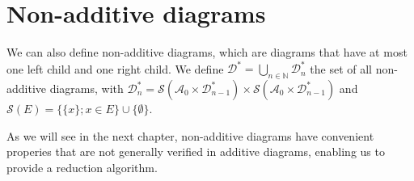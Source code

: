 \section{Non-additive diagrams}

We can also define non-additive diagrams, which are diagrams that have at most one left child and one right child. We define $\mathcal{D}^* = \bigcup_{n \in \mathbb{N}} \mathcal{D}^*_n$ the set of all non-additive diagrams, with $\mathcal{D}^*_n = \mathscr{S}(\mathcal{A}_0 \times \mathcal{D}^*_{n-1}) \times \mathscr{S}(\mathcal{A}_0 \times \mathcal{D}^*_{n-1})$ and $\mathscr{S}(E) = \{ \{x\} ; x \in E\} \cup \{\emptyset\}$.

As we will see in the next chapter, non-additive diagrams have convenient properies that are not generally verified in additive diagrams, enabling us to provide a reduction algorithm.